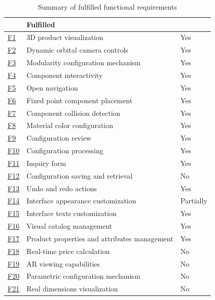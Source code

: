 \begin{table}[htb]
\centering
\begin{tabular}{>{\raggedright\arraybackslash}p{0.5cm} >{\raggedright\arraybackslash}p{8cm} >{\centering\arraybackslash}p{2cm}}
\toprule
\multicolumn{2}{c}{\textbf{Requirement}} &
\textbf{Fulfilled}\\ 
\midrule
\hyperref[itm:F1]{F1} & 3D product visualization &
    Yes \\
\hyperref[itm:F2]{F2} & Dynamic orbital camera controls &
    Yes \\
\hyperref[itm:F3]{F3} & Modularity configuration mechanism &
    Yes \\
\hyperref[itm:F4]{F4} & Component interactivity &
    Yes \\
\hyperref[itm:F5]{F5} & Open navigation &
    Yes \\
\hyperref[itm:F6]{F6} & Fixed point component placement &
    Yes \\
\hyperref[itm:F7]{F7} & Component collision detection &
    Yes \\
\hyperref[itm:F8]{F8} & Material color configuration &
    Yes \\
\hyperref[itm:F9]{F9} & Configuration review &
    Yes \\
\hyperref[itm:F10]{F10} & Configuration processing &
    Yes \\
\hyperref[itm:F11]{F11} & Inquiry form &
    Yes \\
\hyperref[itm:F12]{F12} & Configuration saving and retrieval &
    No \\
\hyperref[itm:F13]{F13} & Undo and redo actions &
    Yes \\
\hyperref[itm:F14]{F14} & Interface appearance customization &
    Partially \\
\hyperref[itm:F15]{F15} & Interface texts customization &
    Yes \\
\hyperref[itm:F16]{F16} & Visual catalog management &
    Yes \\
\hyperref[itm:F17]{F17} & Product properties and attributes management &
    Yes \\
\hyperref[itm:F18]{F18} & Real-time price calculation &
    No \\
\hyperref[itm:F19]{F19} & AR viewing capabilities &
    No \\
\hyperref[itm:F20]{F20} & Parametric configuration mechanism &
    No \\
\hyperref[itm:F21]{F21} & Real dimensions visualization &
    No \\
\bottomrule
\end{tabular}
\caption{Summary of fulfilled functional requirements}
\label{table:summary-implementation}
\end{table}


